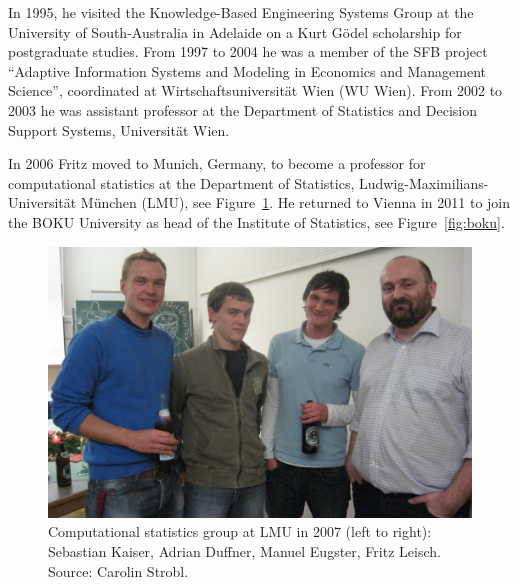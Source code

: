In 1995, he visited the Knowledge-Based Engineering Systems Group at the University of
South-Australia in Adelaide on a Kurt Gödel scholarship for postgraduate
studies. From 1997 to 2004 he was a member of the SFB project
``Adaptive Information Systems and Modeling in Economics and Management Science'', coordinated
at Wirtschaftsuniversität Wien (WU Wien). From 2002 to 2003 he was assistant professor
at the Department of Statistics and Decision Support Systems, Universität Wien.

In 2006 Fritz moved to Munich, Germany, to become a professor for computational
statistics at the Department of Statistics, Ludwig-Maximilians-Universität München (LMU), see Figure~\ref{fig:lmu}.
He returned to Vienna in 2011 to join the BOKU University as head of the Institute of Statistics, see Figure~\ref{fig:boku}.

\begin{figure}[t!]

{\centering \includegraphics[width=0.83\linewidth]{figures/img-lmu} 

}

\caption{Computational statistics group at LMU in 2007 (left to right): Sebastian Kaiser, Adrian Duffner, Manuel Eugster, Fritz Leisch. Source: Carolin Strobl.}\label{fig:lmu}
\end{figure}

